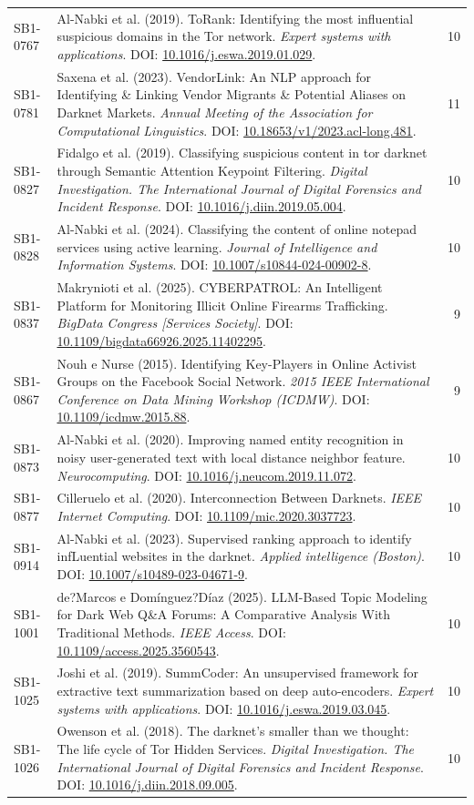 \begin{small}
\begin{longtable}{lp{11.2cm}r}
SB1-0767 & Al-Nabki et al. (2019). ToRank: Identifying the most influential suspicious domains in the Tor network. \textit{Expert systems with applications}. DOI: \url{10.1016/j.eswa.2019.01.029}. & 10 \\
SB1-0781 & Saxena et al. (2023). VendorLink: An NLP approach for Identifying \& Linking Vendor Migrants \& Potential Aliases on Darknet Markets. \textit{Annual Meeting of the Association for Computational Linguistics}. DOI: \url{10.18653/v1/2023.acl-long.481}. & 11 \\
SB1-0827 & Fidalgo et al. (2019). Classifying suspicious content in tor darknet through Semantic Attention Keypoint Filtering. \textit{Digital Investigation. The International Journal of Digital Forensics and Incident Response}. DOI: \url{10.1016/j.diin.2019.05.004}. & 10 \\
SB1-0828 & Al-Nabki et al. (2024). Classifying the content of online notepad services using active learning. \textit{Journal of Intelligence and Information Systems}. DOI: \url{10.1007/s10844-024-00902-8}. & 10 \\
SB1-0837 & Makrynioti et al. (2025). CYBERPATROL: An Intelligent Platform for Monitoring Illicit Online Firearms Trafficking. \textit{BigData Congress [Services Society]}. DOI: \url{10.1109/bigdata66926.2025.11402295}. & 9 \\
SB1-0867 & Nouh e Nurse (2015). Identifying Key-Players in Online Activist Groups on the Facebook Social Network. \textit{2015 IEEE International Conference on Data Mining Workshop (ICDMW)}. DOI: \url{10.1109/icdmw.2015.88}. & 9 \\
SB1-0873 & Al-Nabki et al. (2020). Improving named entity recognition in noisy user-generated text with local distance neighbor feature. \textit{Neurocomputing}. DOI: \url{10.1016/j.neucom.2019.11.072}. & 10 \\
SB1-0877 & Cilleruelo et al. (2020). Interconnection Between Darknets. \textit{IEEE Internet Computing}. DOI: \url{10.1109/mic.2020.3037723}. & 10 \\
SB1-0914 & Al-Nabki et al. (2023). Supervised ranking approach to identify infLuential websites in the darknet. \textit{Applied intelligence (Boston)}. DOI: \url{10.1007/s10489-023-04671-9}. & 10 \\
SB1-1001 & de?Marcos e Domínguez?Díaz (2025). LLM-Based Topic Modeling for Dark Web Q\&A Forums: A Comparative Analysis With Traditional Methods. \textit{IEEE Access}. DOI: \url{10.1109/access.2025.3560543}. & 10 \\
SB1-1025 & Joshi et al. (2019). SummCoder: An unsupervised framework for extractive text summarization based on deep auto-encoders. \textit{Expert systems with applications}. DOI: \url{10.1016/j.eswa.2019.03.045}. & 10 \\
SB1-1026 & Owenson et al. (2018). The darknet's smaller than we thought: The life cycle of Tor Hidden Services. \textit{Digital Investigation. The International Journal of Digital Forensics and Incident Response}. DOI: \url{10.1016/j.diin.2018.09.005}. & 10 \\
\hline
\end{longtable}
\end{small}

